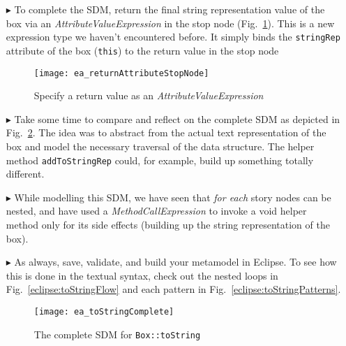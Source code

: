 \begin{itemize}
\item[$\blacktriangleright$] To complete the SDM, return the final string representation value of the box via an \emph{AttributeValueExpression} in
the stop node (Fig.~\ref{ea:toStringStopNode}). This is a new expression type we haven't encountered before. It simply
binds the \texttt{stringRep} attribute of the box (\texttt{this}) to the return value in the stop node

\newpage

\begin{figure}[htbp]
\begin{center}
  \texttt{[image: ea\_returnAttributeStopNode]}
  \caption{Specify a return value as an \emph{AttributeValueExpression}}
  \label{ea:toStringStopNode}
\end{center}
\end{figure}

\vspace{0.5cm}

\item[$\blacktriangleright$] Take some time to compare and reflect on the complete SDM as depicted in Fig.~\ref{ea:sdm_tostringComplete}.  The idea was to
abstract from the actual text representation of the box and model the necessary traversal of the data structure. The helper method \texttt{addToStringRep}
could, for example, build up something totally different.

\vspace{0.5cm}

\item[$\blacktriangleright$] While modelling this SDM, we have seen that \emph{for each} story nodes can be nested, and have used a \emph{MethodCallExpression}
to invoke a void helper method only for its side effects (building up the string representation of the box).

\vspace{0.5cm}

\item[$\blacktriangleright$] As always, save, validate, and build your metamodel in Eclipse. To see how this is done in the
textual syntax, check out the nested loops in Fig.~\ref{eclipse:toStringFlow} and each pattern in Fig.~\ref{eclipse:toStringPatterns}.

\newpage

\vspace*{2cm}

\begin{figure}[htbp]
\begin{center}
  \texttt{[image: ea\_toStringComplete]}
  \caption{The complete SDM for \texttt{Box::toString}}  
  \label{ea:sdm_tostringComplete}
\end{center}
\end{figure}
\FloatBarrier


\end{itemize}
